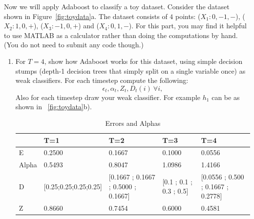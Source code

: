 \documentclass[english]{article}
\begin{document}
Now we will apply Adaboost to classify a toy dataset. Consider the
dataset shown in Figure~\ref{fig:toydata}a. The dataset consists of
$4$ points: ($X_1 : 0,-1,-$), ($X_2 : 1,0,+$), ($X_3 : -1,0,+$) and
($X_4 : 0,1,-$).  For this part, you may find it helpful to use MATLAB
as a calculator rather than doing the computations by hand.  (You do
not need to submit any code though.)

\begin{enumerate}
\item  For $T=4$, show how Adaboost works for this dataset,
  using simple decision stumps (depth-1 decision trees that simply
  split on a single variable once) as weak classifiers.  For each
  timestep compute the following:
  \[ \epsilon_t, \alpha_t, Z_t, D_t(i)~\forall i, \] Also for each
  timestep draw your weak classifier. For example $h_1$ can be as
  shown in ~\ref{fig:toydata}b). 

\begin{table}[H]
\centering
\caption{Errors and Alphas}
\label{Values}
\begin{tabular}{|l|l|l|l|l|}
\hline
      & T=1                       & T=2                                     & T=3                         & T=4                                    \\ \hline
E     & 0.2500                    & 0.1667                                  & 0.1000                      & 0.0556                                 \\ \hline
Alpha & 0.5493                    & 0.8047                                  & 1.0986                      & 1.4166                                 \\ \hline
D     & {[}0.25;0.25;0.25;0.25{]} & {[}0.1667 ; 0.1667 ; 0.5000 ; 0.1667{]} & {[}0.1 ; 0.1 ; 0.3 ; 0.5{]} & {[}0.0556 ; 0.500 ; 0.1667 ; 0.2778{]} \\ \hline
Z     & 0.8660                    & 0.7454                                  & 0.6000                      & 0.4581                                 \\ \hline
\end{tabular}
\end{table}


\end{enumerate}
\end{document}
